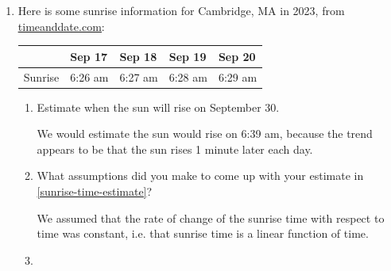 \documentclass{article}
\makeatletter
\let\@href=\href
\renewcommand{\href}[2]{\@href{#1}{\ul{#2}}}
\makeatother
\begin{document}
\begin{enumerate}
\item  \label{sunrise-time} 

  Here is some sunrise information for Cambridge, MA in 2023, from \href{https://www.timeanddate.com/sun/@4931972}{timeanddate.com}:

  \begin{center}
    \begin{tabular}{l|l|l|l|l}
      &  Sep 17 & Sep 18 & Sep 19 & Sep 20 \\
      \hline
      Sunrise & 6:26 am & 6:27 am &  6:28 am & 6:29 am 
    \end{tabular}    
  \end{center}

  \begin{enumerate}
  \item \label{sunrise-time-estimate}


    \begin{problem}[1in]
      Estimate when the sun will rise on September 30.
    \end{problem}

    \begin{solution}
      We would estimate the sun would rise on 6:39 am, because the trend appears to be that the sun rises 1 minute later each day.
    \end{solution}

  \item


    \begin{problem}[1in]
      What assumptions did you make to come up with your estimate in \ref{sunrise-time-estimate}?
    \end{problem}
    
    \begin{solution}
      We assumed that the rate of change of the sunrise time with respect to time was constant, i.e.
      that sunrise time is a linear function of time.
    \end{solution}

  \item

\end{enumerate}
\end{enumerate}
\end{document}
